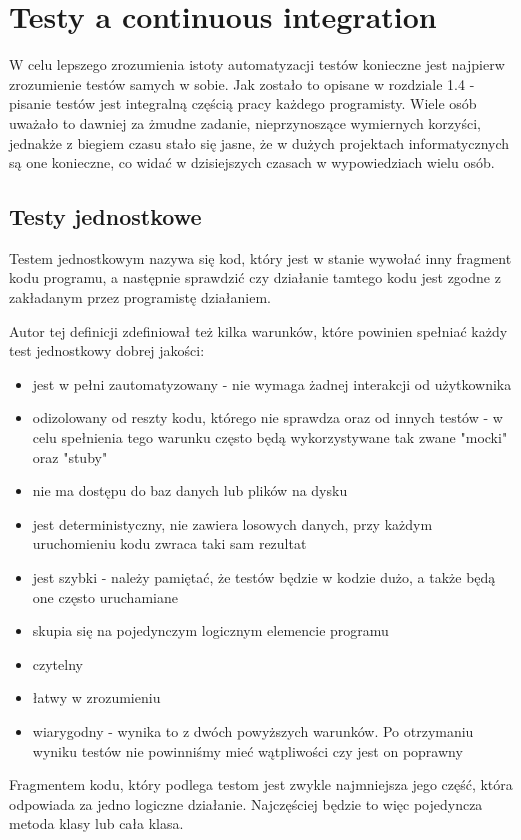 \section{Testy a continuous integration}
W celu lepszego zrozumienia istoty automatyzacji testów konieczne jest najpierw zrozumienie testów samych w sobie. Jak zostało to opisane w rozdziale 1.4 - pisanie testów jest integralną częścią pracy każdego programisty. Wiele osób uważało to dawniej za żmudne zadanie, nieprzynoszące wymiernych korzyści, jednakże z biegiem czasu stało się jasne, że w dużych projektach informatycznych są one konieczne, co widać w dzisiejszych czasach w wypowiedziach wielu osób. \cite{UnitOpinions} \cite{UnitResults}

\subsection{Testy jednostkowe}
Testem jednostkowym nazywa się kod, który jest w stanie wywołać inny fragment kodu programu, a następnie sprawdzić czy działanie tamtego kodu jest zgodne z zakładanym przez programistę działaniem. \cite{UnitDefinition}
\par Autor tej definicji zdefiniował też kilka warunków, które powinien spełniać każdy test jednostkowy dobrej jakości: 
\begin{itemize}
    \item jest w pełni zautomatyzowany - nie wymaga żadnej interakcji od użytkownika
    \item odizolowany od reszty kodu, którego nie sprawdza oraz od innych testów - w celu spełnienia tego warunku często będą wykorzystywane tak zwane "mocki" oraz "stuby" 
    \item nie ma dostępu do baz danych lub plików na dysku
    \item jest deterministyczny, nie zawiera losowych danych, przy każdym uruchomieniu kodu zwraca taki sam rezultat
    \item jest szybki - należy pamiętać, że testów będzie w kodzie dużo, a także będą one często uruchamiane
    \item skupia się na pojedynczym logicznym elemencie programu
    \item czytelny
    \item łatwy w zrozumieniu
    \item wiarygodny - wynika to z dwóch powyższych warunków. Po otrzymaniu wyniku testów nie powinniśmy mieć wątpliwości czy jest on poprawny
\end{itemize}
Fragmentem kodu, który podlega testom jest zwykle najmniejsza jego część, która odpowiada za jedno logiczne działanie. Najczęściej będzie to więc pojedyncza metoda klasy lub cała klasa. 

